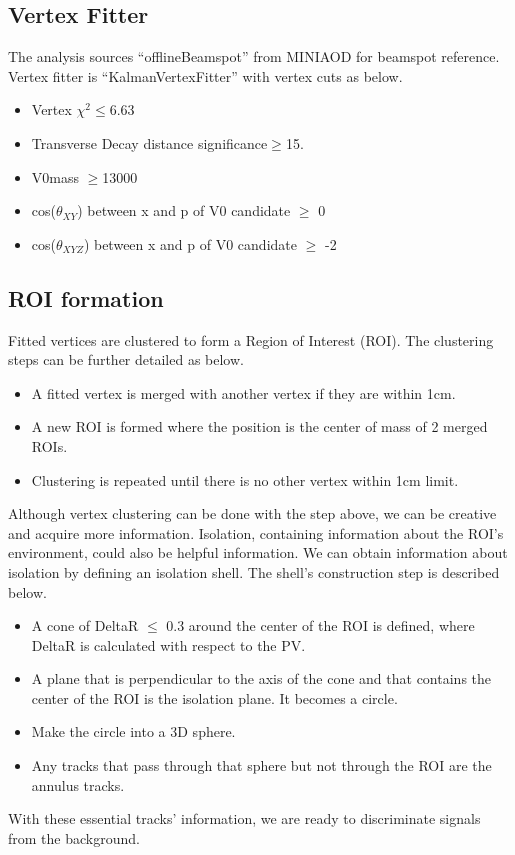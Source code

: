 \subsection{Vertex Fitter}\label{sec:ROI_V0Fitter}

The analysis sources ``offlineBeamspot'' from MINIAOD for beamspot reference.
Vertex fitter is ``KalmanVertexFitter'' with vertex cuts as below.
\begin{itemize}
  \item Vertex $\chi^{2}\leq$6.63 
  \item Transverse Decay distance significance$\geq$15.
  \item V0mass $\geq$13000\GeV
  \item cos($\theta_{XY}$) between x and p of V0 candidate $\geq$ 0
  \item cos($\theta_{XYZ}$) between x and p of V0 candidate $\geq$ -2
\end{itemize}

\subsection{ROI formation}\label{sec:ROI_ROIformation}
Fitted vertices are clustered to form a Region of Interest (ROI).
The clustering steps can be further detailed as below.
\begin{itemize}
  \item A fitted vertex is merged with another vertex if they are within 1cm. 
  \item A new ROI is formed where the position is the center of mass of 2 merged ROIs.
  \item Clustering is repeated until there is no other vertex within 1cm limit.
\end{itemize}
Although vertex clustering can be done with the step above, we can be creative and acquire more information.
Isolation, containing information about the ROI's environment, could also be helpful information.
We can obtain information about isolation by defining an isolation shell.
The shell's construction step is described below.
\begin{itemize}
  \item A cone of DeltaR $\leq$ 0.3 around the center of the ROI is defined, where DeltaR is calculated with respect to the PV.
  \item A plane that is perpendicular to the axis of the cone and that contains the center of the ROI is the isolation plane. It becomes a circle. 
  \item Make the circle into a 3D sphere.
  \item Any tracks that pass through that sphere but not through the ROI are the annulus tracks.
\end{itemize}
With these essential tracks' information, we are ready to discriminate signals from the background.

